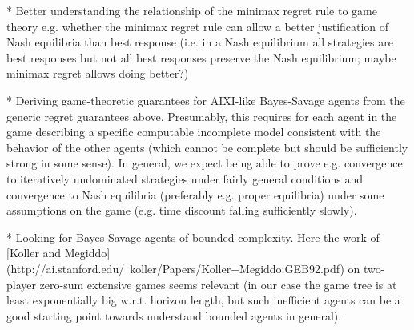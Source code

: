 \documentclass[a4paper]{article}
\begin{document}
* Better understanding the relationship of the minimax regret rule to game theory e.g. whether the minimax regret rule can allow a better justification of Nash equilibria than best response (i.e. in a Nash equilibrium all strategies are best responses but not all best responses preserve the Nash equilibrium; maybe minimax regret allows doing better?)

* Deriving game-theoretic guarantees for AIXI-like Bayes-Savage agents from the generic regret guarantees above. Presumably, this requires for each agent in the game describing a specific computable incomplete model consistent with the behavior of the other agents (which cannot be complete but should be sufficiently strong in some sense). In general, we expect being able to prove e.g. convergence to iteratively undominated strategies under fairly general conditions and convergence to Nash equilibria (preferably e.g. proper equilibria) under some assumptions on the game (e.g. time discount falling sufficiently slowly).

* Looking for Bayes-Savage agents of bounded complexity. Here the work of [Koller and Megiddo](http://ai.stanford.edu/~koller/Papers/Koller+Megiddo:GEB92.pdf) on two-player zero-sum extensive games seems relevant (in our case the game tree is at least exponentially big w.r.t. horizon length, but such inefficient agents can be a good starting point towards understand bounded agents in general).
\end{document}
